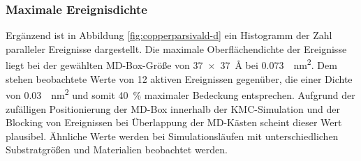 \subsubsection{Maximale Ereignisdichte}
Ergänzend ist in Abbildung \ref{fig:copperparsivald-d} ein Histogramm der Zahl paralleler Ereignisse dargestellt.
Die maximale Oberflächendichte der Ereignisse liegt bei der gewählten MD-Box-Größe von \SI{37x37}{\angstrom} bei \SI{0.073}{\per\nano\meter\squared}.
Dem stehen beobachtete Werte von 12 aktiven Ereignissen gegenüber, die einer Dichte von \SI{0.03}{\per\nano\meter\squared} und somit \SI{40}{\percent} maximaler Bedeckung entsprechen.
Aufgrund der zufälligen Positionierung der MD-Box innerhalb der KMC-Simulation und der Blocking von Ereignissen bei Überlappung der MD-Kästen scheint dieser Wert plausibel.
Ähnliche Werte werden bei Simulationsläufen mit unterschiedlichen Substratgrößen und Materialien beobachtet werden.
